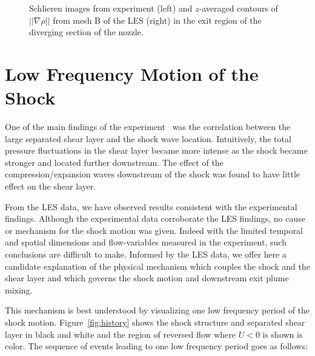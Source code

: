 \documentclass[]{aiaa-tc}%
\begin{document}
\begin{figure}[!h]%
	\begin{center}
	\end{center}
 	\caption{Schlieren images from experiment \cite{Papam:10} (left) and $z$-averaged contours of $||\nabla\rho||$ from mesh B of the LES (right) in the exit region of the diverging section of the nozzle.  }
 	\label{fig:schl_ex}
\end{figure}


\section{Low Frequency Motion of the Shock}

One of the main findings of the experiment~\cite{Papam:10} was the correlation between the large separated shear layer and the shock wave location.  Intuitively, the total pressure fluctuations in the shear layer became more intense as the shock became stronger and located further downstream.   The effect of the compression/expansion waves downstream of the shock was found to have little effect on the shear layer.

From the LES data, we have observed results consistent with the experimental findings.  Although the experimental data corroborate the LES findings, no cause or mechanism for the shock motion was given.  Indeed with the limited temporal and spatial dimensions and flow-variables measured in the experiment, such conclusions are difficult to make.  Informed by the LES data, we offer here a candidate explanation of the physical mechanism which couples the shock and the shear layer and which governs the shock motion and downstream exit plume mixing.


This mechanism is best understood by visualizing one low frequency period of the shock motion.  Figure~\ref{fig:history} shows the shock structure and separated shear layer in black and white and the region of reversed flow where $U<0$ is shown is color.  The sequence of events leading to one low frequency period goes as follows:  

\end{document}
